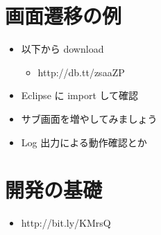 \documentclass[slide,papersize]{jsarticle}
\begin{document}
\section*{画面遷移の例}
\bigskip
\begin{itemize}
\item 以下から download
 \begin{itemize}
 \item http://db.tt/zsaaZP
 \end{itemize}
\bigskip
\item Eclipse に import して確認
\bigskip
\item サブ画面を増やしてみましょう
\bigskip
\item Log 出力による動作確認とか
\end{itemize}

\section*{開発の基礎}
\bigskip
\begin{itemize}
\item http://bit.ly/KMrsQ
\end{itemize}
\end{document}
